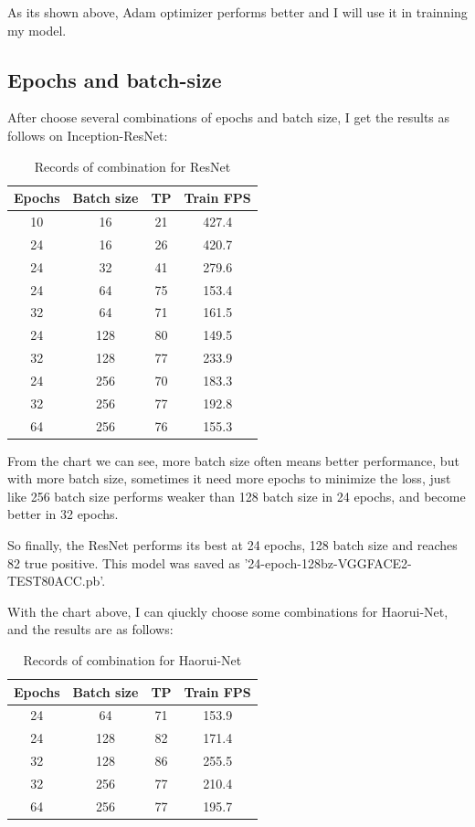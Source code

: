 \documentclass{article}
\begin{document}
As its shown above, Adam optimizer performs better and I will use it in trainning my model.
\subsection{Epochs and batch-size}
After choose several combinations of epochs and batch size,  I get the results as follows on Inception-ResNet:

\begin{table}[H]
\centering
\caption{Records of combination for ResNet}\label{tab:aStrangeTable}%
\begin{tabular}{cccc}
\toprule
Epochs & Batch size& TP &Train FPS\\
\midrule
10& 16 & 21 & 427.4\\
24& 16& 26 & 420.7\\
24 & 32 & 41 & 279.6\\
24 & 64 & 75 & 153.4\\
32 & 64 & 71 & 161.5\\
24 & 128 & 80 & 149.5\\
32 & 128 & 77 & 233.9\\
24 & 256 & 70  &183.3\\
32 & 256 & 77  &192.8\\
64 & 256 & 76  &155.3\\
\bottomrule
\end{tabular}

\end{table}
From the chart we can see, more batch size often means better performance, but with more batch size, sometimes it need more epochs to minimize the loss, just like 256 batch size performs weaker than 128 batch size in 24 epochs, and become better in 32 epochs.

So finally, the ResNet performs its best at 24 epochs, 128 batch size and reaches 82 true positive. This model was saved as  '24-epoch-128bz-VGGFACE2-TEST80ACC.pb'.

With the chart above, I can qiuckly choose some combinations for Haorui-Net, and the results are as follows:

\begin{table}[H]
\centering
\caption{Records of combination for Haorui-Net}\label{tab:aStrangeTable}%
\begin{tabular}{cccc}
\toprule
Epochs & Batch size& TP &Train FPS\\
\midrule
24 & 64 & 71 & 153.9\\
24 & 128 & 82 & 171.4\\
32 & 128 & 86 & 255.5\\
32 & 256 & 77 & 210.4\\
64 & 256 & 77 & 195.7\\
\bottomrule
\end{tabular}
\end{table}
\end{document}
